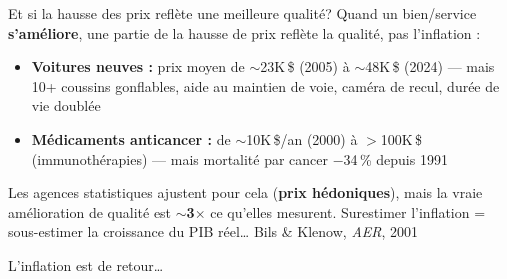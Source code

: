 \documentclass[aspectratio=169]{beamer}
\begin{document}
\begin{frame}[t]{Et si la hausse des prix refl\`ete une meilleure qualit\'e?}
   \small
   Quand un bien/service \textbf{s'am\'eliore}, une partie de la hausse de prix refl\`ete la qualit\'e, pas l'inflation :
   \vspace{0.15cm}
   \begin{itemize}
      \setlength\itemsep{0.15cm}
      \item \textbf{Voitures neuves :} prix moyen de $\sim$23K\,\$ (2005) \`a $\sim$48K\,\$ (2024) --- mais 10+ coussins gonflables, aide au maintien de voie, cam\'era de recul, dur\'ee de vie doubl\'ee
      \item \textbf{M\'edicaments anticancer :} de $\sim$10K\,\$/an (2000) \`a $>$100K\,\$ (immunoth\'erapies) --- mais mortalit\'e par cancer $-$34\,\% depuis 1991
   \end{itemize}
   \vspace{0.1cm}
   \begin{keyinsight}
      Les agences statistiques ajustent pour cela (\textbf{prix h\'edoniques}), mais la vraie am\'elioration de qualit\'e est $\sim$\textbf{3$\times$} ce qu'elles mesurent. Surestimer l'inflation = sous-estimer la croissance du PIB r\'eel\ldots
      \hfill{\scriptsize\textcolor{HECgray}{Bils \& Klenow, \textit{AER}, 2001}}
   \end{keyinsight}
\end{frame}

\begin{frame}{L'inflation est de retour\ldots}
\end{frame}
\end{document}
